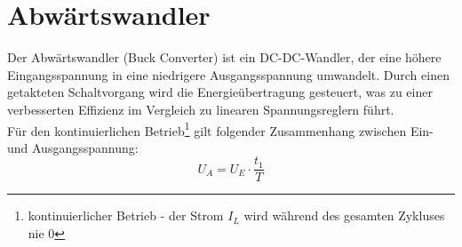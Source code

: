 \section{Abwärtswandler}
\label{sec:abwaertswandler}
Der Abwärtswandler (Buck Converter) ist ein DC-DC-Wandler, der eine höhere Eingangsspannung in eine niedrigere Ausgangsspannung umwandelt. Durch einen getakteten Schaltvorgang wird die Energieübertragung gesteuert, was zu einer verbesserten Effizienz im Vergleich zu linearen Spannungsreglern führt.
\\
Für den kontinuierlichen Betrieb\footnote{kontinuierlicher Betrieb - der Strom $I_L$ wird während des gesamten Zykluses nie 0} gilt folgender Zusammenhang zwischen Ein- und Ausgangsspannung:
\begin{equation}
    U_{A} = U_{E} \cdot \frac{t_{1}}{T}
\end{equation}
